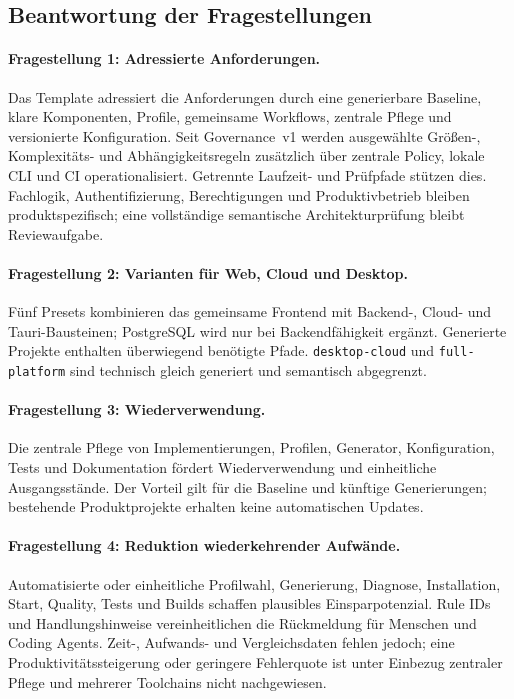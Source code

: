 \subsection{Beantwortung der Fragestellungen}
\label{subsec:beantwortung-fragestellungen}

\paragraph{Fragestellung 1: Adressierte Anforderungen.}
Das Template adressiert die Anforderungen durch eine generierbare Baseline,
klare Komponenten, Profile, gemeinsame Workflows, zentrale Pflege und
versionierte Konfiguration. Seit Governance~v1 werden ausgewählte Größen-,
Komplexitäts- und Abhängigkeitsregeln zusätzlich über zentrale Policy, lokale
CLI und CI operationalisiert. Getrennte Laufzeit- und Prüfpfade stützen dies.
Fachlogik, Authentifizierung, Berechtigungen und Produktivbetrieb bleiben
produktspezifisch; eine vollständige semantische Architekturprüfung bleibt
Reviewaufgabe.

\paragraph{Fragestellung 2: Varianten für Web, Cloud und Desktop.}
Fünf Presets kombinieren das gemeinsame Frontend mit Backend-, Cloud- und
Tauri-Bausteinen; PostgreSQL wird nur bei Backendfähigkeit ergänzt. Generierte
Projekte enthalten überwiegend benötigte Pfade. \texttt{desktop-cloud} und
\texttt{full-platform} sind technisch gleich generiert und semantisch
abgegrenzt.

\paragraph{Fragestellung 3: Wiederverwendung.}
Die zentrale Pflege von Implementierungen, Profilen, Generator, Konfiguration,
Tests und Dokumentation fördert Wiederverwendung und einheitliche
Ausgangsstände. Der Vorteil gilt für die Baseline und künftige Generierungen;
bestehende Produktprojekte erhalten keine automatischen Updates.

\paragraph{Fragestellung 4: Reduktion wiederkehrender Aufwände.}
Automatisierte oder einheitliche Profilwahl, Generierung, Diagnose,
Installation, Start, Quality, Tests und Builds schaffen plausibles
Einsparpotenzial. Rule IDs und Handlungshinweise vereinheitlichen die
Rückmeldung für Menschen und Coding Agents. Zeit-, Aufwands- und
Vergleichsdaten fehlen jedoch; eine Produktivitätssteigerung oder geringere
Fehlerquote ist unter Einbezug zentraler Pflege und mehrerer Toolchains nicht
nachgewiesen.

